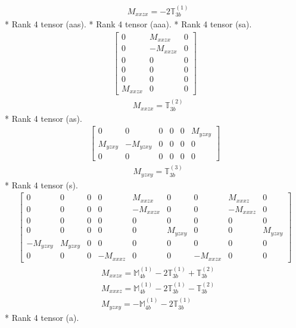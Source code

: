 \documentclass[fleqn,8pt,landscape]{jsarticle}
\begin{document}
\begin{align*}
& M_{xxzx} = - 2 \mathbb{T}_{3b}^{(1)}
\end{align*}
* Rank 4 tensor (aas).
* Rank 4 tensor (aaa).
* Rank 4 tensor (sa).
\begin{align*}
\begin{bmatrix} 0 & M_{xxzx} & 0 \\ 0 & - M_{xxzx} & 0 \\ 0 & 0 & 0 \\ 0 & 0 & 0 \\ 0 & 0 & 0 \\ M_{xxzx} & 0 & 0 \end{bmatrix}
\end{align*}
\begin{align*}
& M_{xxzx} = \mathbb{T}_{3b}^{(2)}
\end{align*}
* Rank 4 tensor (as).
\begin{align*}
\begin{bmatrix} 0 & 0 & 0 & 0 & 0 & M_{yzxy} \\ M_{yzxy} & - M_{yzxy} & 0 & 0 & 0 & 0 \\ 0 & 0 & 0 & 0 & 0 & 0 \end{bmatrix}
\end{align*}
\begin{align*}
& M_{yzxy} = \mathbb{T}_{3b}^{(3)}
\end{align*}
* Rank 4 tensor (s).
\begin{align*}
\begin{bmatrix} 0 & 0 & 0 & 0 & M_{xxzx} & 0 & 0 & M_{xxxz} & 0 \\ 0 & 0 & 0 & 0 & - M_{xxzx} & 0 & 0 & - M_{xxxz} & 0 \\ 0 & 0 & 0 & 0 & 0 & 0 & 0 & 0 & 0 \\ 0 & 0 & 0 & 0 & 0 & M_{yzxy} & 0 & 0 & M_{yzxy} \\ - M_{yzxy} & M_{yzxy} & 0 & 0 & 0 & 0 & 0 & 0 & 0 \\ 0 & 0 & 0 & - M_{xxxz} & 0 & 0 & - M_{xxzx} & 0 & 0 \end{bmatrix}
\end{align*}
\begin{align*}
& M_{xxzx} = \mathbb{M}_{4b}^{(1)} - 2 \mathbb{T}_{3b}^{(1)} + \mathbb{T}_{3b}^{(2)} \\
& M_{xxxz} = \mathbb{M}_{4b}^{(1)} - 2 \mathbb{T}_{3b}^{(1)} - \mathbb{T}_{3b}^{(2)} \\
& M_{yzxy} = - \mathbb{M}_{4b}^{(1)} - 2 \mathbb{T}_{3b}^{(1)}
\end{align*}
* Rank 4 tensor (a).
\end{document}
